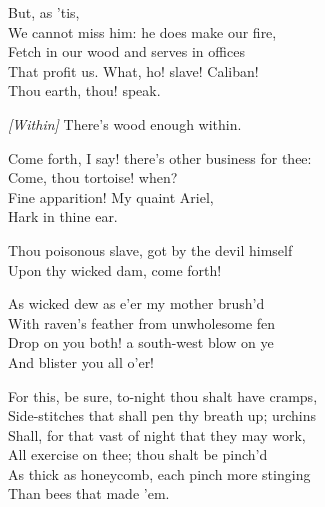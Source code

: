 \begin{verse_speech}[Prospero] 
But, as 'tis,\\
We cannot miss him: he does make our fire,\\
Fetch in our wood and serves in offices\\
That profit us. What, ho! slave! Caliban!\\
Thou earth, thou! speak.
\end{verse_speech}

\begin{verse_speech}[Caliban]
\textit{[Within]} There's wood enough within.
\end{verse_speech}

\begin{verse_speech}[Prospero] 
Come forth, I say! there's other business for thee:\\
Come, thou tortoise! when?\\
Fine apparition! My quaint Ariel,\\
Hark in thine ear.
\end{verse_speech}




\begin{verse_speech}[Prospero] 
Thou poisonous slave, got by the devil himself\\
Upon thy wicked dam, come forth!
\end{verse_speech}

\begin{verse_speech}[Caliban] 
As wicked dew as e'er my mother brush'd\\
With raven's feather from unwholesome fen\\
Drop on you both! a south-west blow on ye\\
And blister you all o'er!
\end{verse_speech}

\begin{verse_speech}[Prospero] 
For this, be sure, to-night thou shalt have cramps,\\
Side-stitches that shall pen thy breath up; urchins\\
Shall, for that vast of night that they may work,\\
All exercise on thee; thou shalt be pinch'd\\
As thick as honeycomb, each pinch more stinging\\
Than bees that made 'em.
\end{verse_speech}

